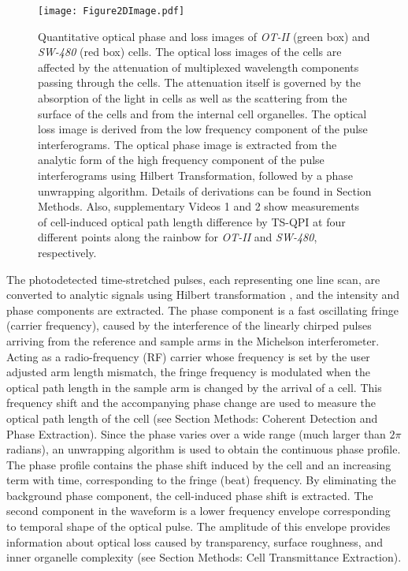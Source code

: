 \documentclass[aps,pra,reprint,superscriptaddress]{revtex4-1}
\begin{document}
\begin{figure}
\texttt{[image: Figure2DImage.pdf]}
\caption{\label{fig:2DImage} Quantitative optical phase and loss images of \textit{OT-II} (green box) and \textit{SW-480} (red box) cells. The optical loss images of the cells are affected by the attenuation of multiplexed wavelength components passing through the cells. The attenuation itself is governed by the absorption of the light in cells as well as the scattering from the surface of the cells and from the internal cell organelles. The optical loss image is derived from the low frequency component of the pulse interferograms. The optical phase image is extracted from the analytic form of the high frequency component of the pulse interferograms using Hilbert Transformation, followed by a phase unwrapping algorithm. Details of derivations can be found in Section Methods. Also, supplementary Videos 1 and 2 show measurements of cell-induced optical path length difference by TS-QPI at four different points along the rainbow for \textit{OT-II} and \textit{SW-480}, respectively.}
\end{figure}

The photodetected time-stretched pulses, each representing one line scan, are converted to analytic signals using Hilbert transformation \cite{king2009hilbert}, and the intensity and phase components are extracted. The phase component is a fast oscillating fringe (carrier frequency), caused by the interference of the linearly chirped pulses arriving from the reference and sample arms in the Michelson interferometer. Acting as a radio-frequency (RF) carrier whose frequency is set by the user adjusted arm length mismatch, the fringe frequency is modulated when the optical path length in the sample arm is changed by the arrival of a cell. This frequency shift and the accompanying phase change are used to measure the optical path length of the cell (see Section Methods: Coherent Detection and Phase Extraction). Since the phase varies over a wide range (much larger than $2 \pi$ radians), an unwrapping algorithm is used to obtain the continuous phase profile. The phase profile contains the phase shift induced by the cell and an increasing term with time, corresponding to the fringe (beat) frequency. By eliminating the background phase component, the cell-induced phase shift is extracted. The second component in the waveform is a lower frequency envelope corresponding to temporal shape of the optical pulse. The amplitude of this envelope provides information about optical loss caused by transparency, surface roughness, and inner organelle complexity (see Section Methods: Cell Transmittance Extraction). 
\end{document}
